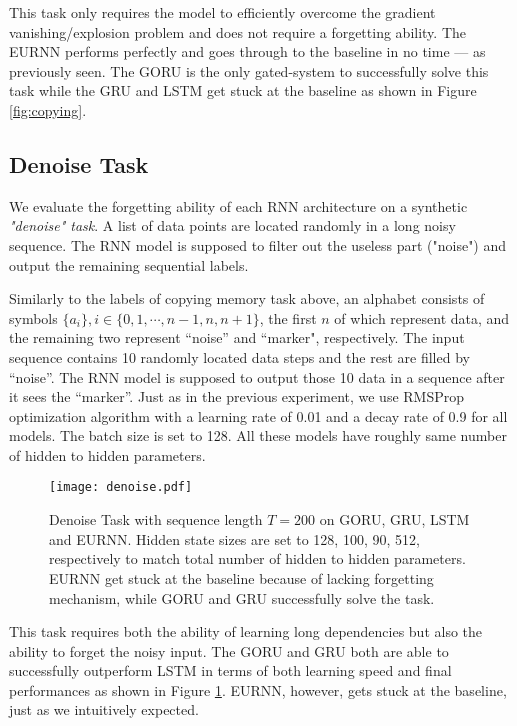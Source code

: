 \documentclass[letterpaper]{article} \usepackage{aaai18}  \usepackage{times}  \usepackage{helvet}  \usepackage{courier}  \usepackage{url}  \usepackage{graphicx}
\begin{document}
This task only requires the model to efficiently overcome the gradient vanishing/explosion problem and does not require a forgetting ability. The EURNN performs perfectly and goes through to the baseline in no time --- as previously seen.
The GORU is the only gated-system to successfully solve this task while the GRU and LSTM get stuck at the baseline as shown in Figure \ref{fig:copying}.


\subsection{Denoise Task}

We evaluate the forgetting ability of each RNN architecture on a synthetic {\it "denoise" task}. A list of data points are located randomly in a long noisy sequence. The RNN model is supposed to filter out the useless part ("noise") and output the remaining sequential labels.

Similarly to the labels of copying memory task above,
an alphabet consists of symbols  $\{a_i\}, i \in \{0, 1, \cdots, n-1, n, n+1\}$, the first $n$ of which represent data, and the remaining two represent ``noise'' and ``marker", respectively.
The input sequence contains 10 randomly located data steps and the rest are filled by ``noise''. The RNN model is supposed to output those 10 data in a sequence after it sees the ``marker''.
Just as in the previous experiment, we use RMSProp optimization algorithm with a learning rate of 0.01 and a decay rate of 0.9 for all models. The batch size is set to 128. All these models have roughly same number of hidden to hidden parameters.

\begin{figure}[h!]
\centering
\texttt{[image: denoise.pdf]}
\caption{Denoise Task with sequence length $T=200$ on GORU, GRU, LSTM and EURNN.  Hidden state sizes are set to 128, 100, 90, 512, respectively to match total number of hidden to hidden parameters. EURNN get stuck at the baseline because of lacking forgetting mechanism, while GORU and GRU successfully solve the task.}
\label{fig:denoise}
\end{figure}

This task requires both the ability of learning long dependencies but also the ability to forget the noisy input. 
The GORU and GRU both are able to successfully outperform LSTM in terms of both learning speed and final performances as shown in Figure \ref{fig:denoise}. EURNN, however, gets stuck at the baseline, just as we intuitively expected.
\end{document}
